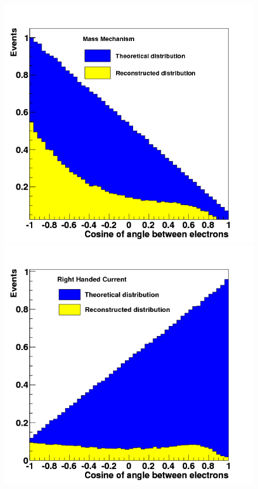 \documentclass[main.tex]{subfiles}
\begin{document}
\begin{figure}[h!]
\begin{center}
\includegraphics[scale=0.3]{pictures/Chap2/MMcos.png}
\includegraphics[scale=0.3]{pictures/Chap2/RHCcos.png}

\end{center}
\end{figure}
\end{document}
